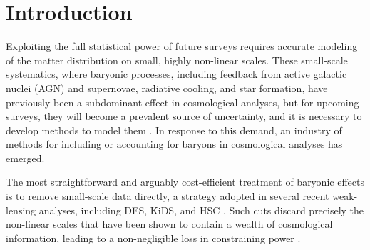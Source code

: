 \documentclass[linenumbers,trackchanges, twocolumn]{aastex701}
\begin{document}


\section{Introduction} 
Exploiting the full statistical power of future surveys requires accurate modeling of the matter distribution on small, highly non-linear scales. These small-scale systematics, where baryonic processes, including feedback from active galactic nuclei (AGN) and supernovae, radiative cooling, and star formation, have previously been a subdominant effect in cosmological analyses, but for upcoming surveys, they will become a prevalent source of uncertainty, and it is necessary to develop methods to model them \citep[e.g.][]{Jing2006,Chisari2019, Schneider2019}. In response to this demand, an industry of methods for including or accounting for baryons in cosmological analyses has emerged. 

The most straightforward and arguably cost-efficient treatment of baryonic effects is to remove small-scale data directly, a strategy adopted in several recent weak-lensing analyses, including DES, KiDS, and HSC \citep[e.g.][]{Secco2022,Li2023a,Li2023b}. Such cuts discard precisely the non-linear scales that have been shown to contain a wealth of cosmological information, leading to a non-negligible loss in constraining power \citep[e.g.][]{Horowitz2017, VillaescusaNavarro2021a}. 
\end{document}
